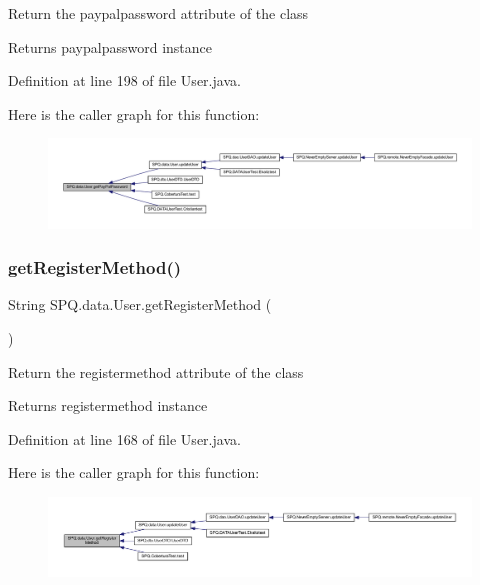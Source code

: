 Return the paypalpassword attribute of the class \begin{DoxyReturn}{Returns}
paypalpassword instance 
\end{DoxyReturn}


Definition at line 198 of file User.\+java.

Here is the caller graph for this function\+:\nopagebreak
\begin{figure}[H]
\begin{center}
\leavevmode
\includegraphics[width=350pt]{class_s_p_q_1_1data_1_1_user_aa3a0bdf1676addb67307fa9a66495fa4_icgraph}
\end{center}
\end{figure}
\mbox{\label{class_s_p_q_1_1data_1_1_user_a4a336e889bfdefbd439134b27e8873fc}} 
\subsubsection{\texorpdfstring{get\+Register\+Method()}{getRegisterMethod()}}
{\footnotesize\ttfamily String S\+P\+Q.\+data.\+User.\+get\+Register\+Method (\begin{DoxyParamCaption}{ }\end{DoxyParamCaption})}

Return the registermethod attribute of the class \begin{DoxyReturn}{Returns}
registermethod instance 
\end{DoxyReturn}


Definition at line 168 of file User.\+java.

Here is the caller graph for this function\+:\nopagebreak
\begin{figure}[H]
\begin{center}
\leavevmode
\includegraphics[width=350pt]{class_s_p_q_1_1data_1_1_user_a4a336e889bfdefbd439134b27e8873fc_icgraph}
\end{center}
\end{figure}
\mbox{\label{class_s_p_q_1_1data_1_1_user_a55d2e322edbbe446287ce25baecdd421}} 

